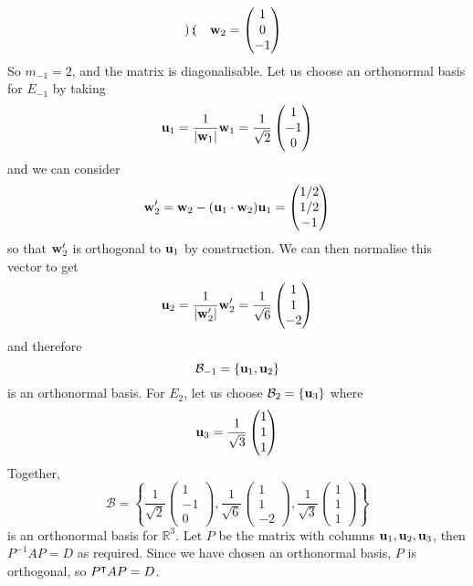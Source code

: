 \documentclass{article}
\begin{document}
\begin{enumerate}[(i)]
\[\begin{pmatrix}
              \end{pmatrix};\quad \vb w_2 = \begin{pmatrix}
                  1 \\ 0 \\ -1
              \end{pmatrix} \]
          So $m_{-1} = 2$, and the matrix is diagonalisable. Let us choose an orthonormal basis for $E_{-1}$ by taking
          \[ \vb u_1 = \frac{1}{\abs{\vb w_1}}\vb w_1 = \frac{1}{\sqrt 2}\begin{pmatrix}
                  1 \\ -1 \\ 0
              \end{pmatrix} \]
          and we can consider
          \[ \vb w_2' = \vb w_2 - (\vb u_1 \cdot \vb w_2)\vb u_1 = \begin{pmatrix}
                  1/2 \\ 1/2 \\ -1
              \end{pmatrix} \]
          so that $\vb w_2'$ is orthogonal to $\vb u_1$ by construction. We can then normalise this vector to get
          \[ \vb u_2 = \frac{1}{\abs{\vb w_2'}}\vb w_2' = \frac{1}{\sqrt 6} \begin{pmatrix}
                  1 \\ 1 \\ -2
              \end{pmatrix} \]
          and therefore
          \[ \mathcal B_{-1} = \{ \vb u_1, \vb u_2 \} \]
          is an orthonormal basis. For $E_2$, let us choose $\mathcal B_2 = \{ \vb u_3 \}$ where
          \[ \vb u_3 = \frac{1}{\sqrt 3}\begin{pmatrix}
                  1 \\ 1 \\ 1
              \end{pmatrix} \]
          Together,
          \[ \mathcal B = \left\{ \frac{1}{\sqrt 2}\begin{pmatrix}
                  1 \\ -1 \\ 0
              \end{pmatrix}, \frac{1}{\sqrt 6} \begin{pmatrix}
                  1 \\ 1 \\ -2
              \end{pmatrix}, \frac{1}{\sqrt 3}\begin{pmatrix}
                  1 \\ 1 \\ 1
              \end{pmatrix} \right\} \]
          is an orthonormal basis for $\mathbb R^3$. Let $P$ be the matrix with columns $\vb u_1, \vb u_2, \vb u_3$, then $P^{-1}AP = D$ as required. Since we have chosen an orthonormal basis, $P$ is orthogonal, so $P^\intercal AP = D$.
\end{enumerate}
\end{document}
